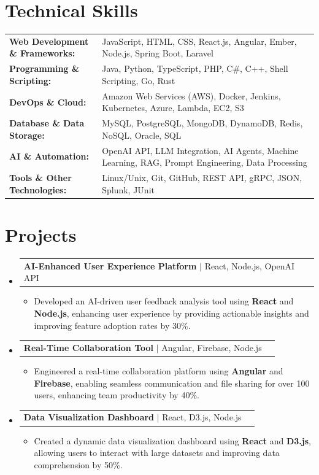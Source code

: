 \documentclass[letterpaper,10pt]{article}
\makeatletter
\newcommand{\resumeItem}[1]{
  \item{\fontsize{8pt}{9pt}\selectfont
    #1 \vspace{-3pt}
  }
}
\newcommand{\resumeProjectHeading}[2]{
    \item
    \begin{tabular*}{1.001\textwidth}{l@{\extracolsep{\fill}}r}
      \fontsize{8.5pt}{10pt}#1 & \textbf{\fontsize{8.5pt}{10pt} #2}\\
    \end{tabular*}\vspace{-7pt}
}
\newcommand{\resumeSubHeadingListStart}{\begin{itemize}[leftmargin=0pt, label={}]}
\newcommand{\resumeSubHeadingListEnd}{\end{itemize}}
\newcommand{\resumeItemListStart}{\begin{itemize}[leftmargin=*]}
\newcommand{\resumeItemListEnd}{\end{itemize}\vspace{-5pt}}
\makeatother
\begin{document}
\section{Technical Skills}
        \vspace{-14pt}
        \begin{table}[h]
            \fontsize{8pt}{9pt}\selectfont
            \begin{tabular}{p{0.3\linewidth} p{0.7\linewidth}}
                \textbf{Web Development \& Frameworks:} & JavaScript, HTML, CSS, React.js, Angular, Ember, Node.js, Spring Boot, Laravel \\
                \textbf{Programming \& Scripting:} & Java, Python, TypeScript, PHP, C\#, C++, Shell Scripting, Go, Rust \\
                \textbf{DevOps \& Cloud:} & Amazon Web Services (AWS), Docker, Jenkins, Kubernetes, Azure, Lambda, EC2, S3 \\
                \textbf{Database \& Data Storage:} & MySQL, PostgreSQL, MongoDB, DynamoDB, Redis, NoSQL, Oracle, SQL \\
                \textbf{AI \& Automation:} & OpenAI API, LLM Integration, AI Agents, Machine Learning, RAG, Prompt Engineering, Data Processing \\
                \textbf{Tools \& Other Technologies:} & Linux/Unix, Git, GitHub, REST API, gRPC, JSON, Splunk, JUnit \\
            \end{tabular}
        \end{table}
 \vspace{-18pt}

\section{Projects}
    \vspace{-5pt}
    \resumeSubHeadingListStart
          \resumeProjectHeading
            {\textbf{AI-Enhanced User Experience Platform} $|$ React, Node.js, OpenAI API}{}
            \resumeItemListStart
                \resumeItem{Developed an AI-driven user feedback analysis tool using \textbf{React} and \textbf{Node.js}, enhancing user experience by providing actionable insights and improving feature adoption rates by 30\%.}
            \resumeItemListEnd
        \vspace{-12pt}
    
        \resumeProjectHeading
            {\textbf{Real-Time Collaboration Tool} $|$ Angular, Firebase, Node.js}{}
        \resumeItemListStart
                \resumeItem{Engineered a real-time collaboration platform using \textbf{Angular} and \textbf{Firebase}, enabling seamless communication and file sharing for over 100 users, enhancing team productivity by 40\%.}
        \resumeItemListEnd
      \vspace{-12pt}
      \resumeProjectHeading
        {\textbf{Data Visualization Dashboard} $|$ React, D3.js, Node.js}{}
    \resumeItemListStart
            \resumeItem{Created a dynamic data visualization dashboard using \textbf{React} and \textbf{D3.js}, allowing users to interact with large datasets and improving data comprehension by 50\%.}
    \resumeItemListEnd
    \resumeSubHeadingListEnd
\end{document}
